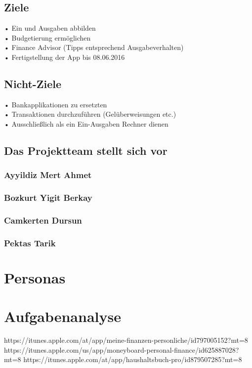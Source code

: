 \documentclass[runningheads,a4paper]{llncs}
\begin{document}
\subsection{Ziele}
•	Ein und Ausgaben abbilden\\
•	Budgetierung ermöglichen\\
•	Finance Advisor (Tipps entsprechend Ausgabeverhalten)\\
•	Fertigstellung der App bis 08.06.2016\\


\subsection{Nicht-Ziele}
•	Bankapplikationen zu ersetzten\\
•	Transaktionen durchzuführen (Gelüberweisungen etc.)\\
•	Ausschließlich als ein Ein-Ausgaben Rechner dienen\\



\subsection{Das Projektteam stellt sich vor}
\subsubsection{Ayyildiz Mert Ahmet}
\subsubsection{Bozkurt Yigit Berkay}
\subsubsection{Camkerten Dursun}
\subsubsection{Pektas Tarik}


\clearpage


\section{Personas}
\bigskip
\bigskip
\section{Aufgabenanalyse}
\bigskip
\bigskip
\clearpage

\begin{thebibliography}{1}
 https://itunes.apple.com/at/app/meine-finanzen-personliche/id797005152?mt=8
https://itunes.apple.com/us/app/moneyboard-personal-finance/id625887028?mt=8
 https://itunes.apple.com/at/app/haushaltsbuch-pro/id879507285?mt=8


\end{thebibliography}
\end{document}
